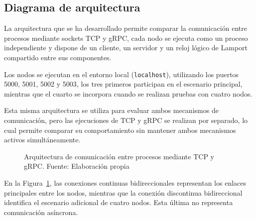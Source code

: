 \subsection{Diagrama de arquitectura}

La arquitectura que se ha desarrollado permite comparar la comunicación
entre procesos mediante sockets TCP y gRPC, cada nodo se ejecuta
como un proceso independiente y dispone de un cliente, un servidor
y un reloj lógico de Lamport compartido entre sus componentes.

Los nodos se ejecutan en el entorno local (\texttt{localhost}),
utilizando los puertos 5000, 5001, 5002 y 5003, los tres primeros
participan en el escenario principal, mientras que el cuarto
se incorpora cuando se realizan pruebas con cuatro nodos.

Esta misma arquitectura se utiliza para evaluar ambos mecanismos
de comunicación, pero las ejecuciones de TCP y gRPC se realizan
por separado, lo cual permite comparar su comportamiento sin
mantener ambos mecanismos activos simultáneamente.

\begin{figure}[H]
    \centering
    \resizebox{\textwidth}{!}{%
        
    }
    \caption{Arquitectura de comunicación entre procesos mediante TCP y gRPC. Fuente: Elaboración propia}
    \label{fig:arquitectura-pe-u1}
\end{figure}

En la Figura~\ref{fig:arquitectura-pe-u1}, las conexiones
continuas bidireccionales representan los enlaces principales entre los nodos,
mientras que la conexión discontinua bidireccional identifica el escenario
adicional de cuatro nodos. Esta última no representa
comunicación asíncrona.